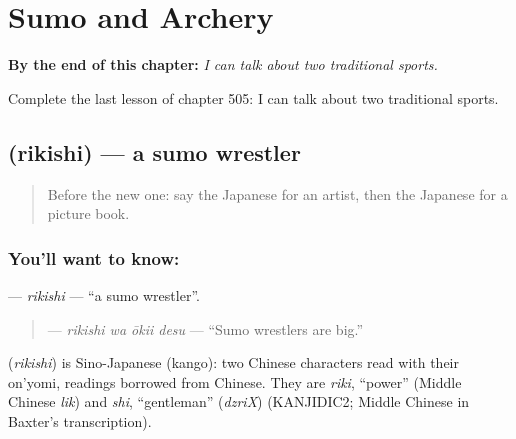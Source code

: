 
\chapter{Sumo and Archery}
\label{ch:ja-sumo-and-archery}

\begin{chapteropening}
\textbf{By the end of this chapter:} \emph{I can talk about two traditional sports.}

Complete the last lesson of chapter 505: I can talk about two traditional sports.
\end{chapteropening}

\section[\texorpdfstring{\ja{りきし} (rikishi)}{りきし (rikishi)}]{ (rikishi) — a sumo wrestler}

\label{lesson:JA-C505-rikishi}



\begin{quote}
Before the new one: say the Japanese for an artist, then the Japanese for a picture book.
\end{quote}

\subsection*{You'll want to know: }
\textbf{} — \emph{rikishi} — \textquotedblleft{}a sumo wrestler\textquotedblright{}.

\begin{quote}
\textbf{ } — \emph{rikishi wa ōkii desu} — \textquotedblleft{}Sumo wrestlers are big.\textquotedblright{}
\end{quote}

\begin{cousinweb}
\textbf{} (\emph{rikishi}) is Sino-Japanese (kango): two Chinese characters read with their on'yomi, readings borrowed from Chinese. They are \emph{riki}, \textquotedblleft{}power\textquotedblright{} (Middle Chinese \emph{lik}) and \emph{shi}, \textquotedblleft{}gentleman\textquotedblright{} (\emph{dzriX}) (KANJIDIC2; Middle Chinese in Baxter's transcription).
\end{cousinweb}

